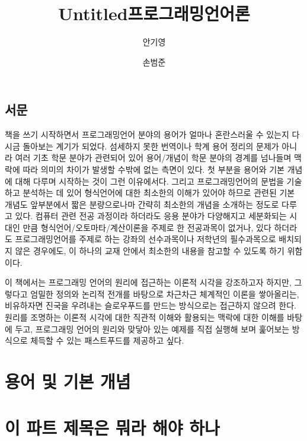 \documentclass[b5paper,chapter,figtabcapt]{oblivoir}
\title{Untitled}
\title{프로그래밍언어론}
\author{안기영 \and 손범준}
\begin{document}
\maketitle

\frontmatter 

\chapter*{서문}
책을 쓰기 시작하면서 프로그래밍언어 분야의 용어가 얼마나 혼란스러울 수 있는지
다시금 돌아보는 계기가 되었다. 섬세하지 못한 번역이나 학계 용어 정리의 문제가
아니라 여러 기초 학문 분야가 관련되어 있어 용어/개념이 학문 분야의 경계를
넘나들며 맥락에 따라 의미의 차이가 발생할 수밖에 없는 측면이 있다. 첫 부분을
용어와 기본 개념에 대해 다루며 시작하는 것이 그런 이유에서다. 그리고
프로그래밍언어의 문법을 기술하고 분석하는 데 있어 형식언어에 대한 최소한의
이해가 있어야 하므로 관련된 기본 개념도 앞부분에서 짧은 분량으로나마
간략히 최소한의 개념을 소개하는 정도로 다루고 있다. 컴퓨터 관련
전공 과정이라 하더라도 응용 분야가 다양해지고 세분화되는 시대인 만큼
형식언어/오토마타/계산이론을 주제로 한 전공과목이 없거나,
있다 하더라도 프로그래밍언어를 주제로 하는 강좌의 선수과목이나
저학년의 필수과목으로 배치되지 않은 경우에도, 이 하나의 교재 안에서
최소한의 내용을 참고할 수 있도록 하기 위함이다.

이 책에서는 프로그래밍 언어의 원리에 접근하는 이론적 시각을 강조하고자
하지만, 그렇다고 엄밀한 정의와 논리적 전개를 바탕으로 차근차근 체계적인
이론을 쌓아올리는, 비유하자면 진국을 우려내는 슬로우푸드를 만드는
방식으로는 접근하지 않으려 한다. 원리를 조명하는 이론적 시각에 대한
직관적 이해와 활용되는 맥락에 대한 이해를 바탕에 두고, 프로그래밍 언어의
원리와 맞닿아 있는 예제를 직접 실행해 보며 훑어보는 방식으로 체득할 수 있는
패스트푸드를 제공하고 싶다. 


\newpage
\tableofcontents

\newpage
\listoffigures

\mainmatter

\part{용어 및 기본 개념}


\part{이 파트 제목은 뭐라 해야 하나}
\end{document}
